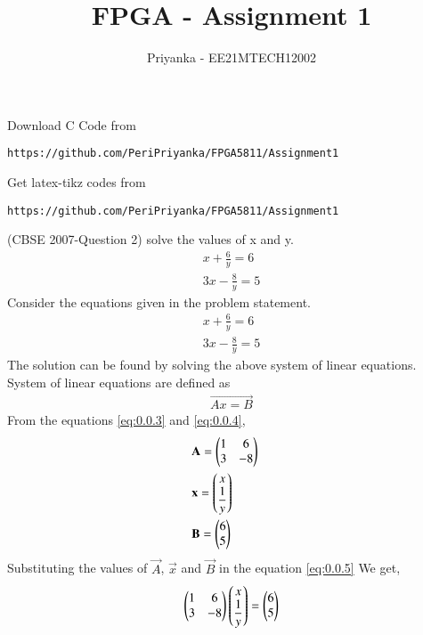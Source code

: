 \documentclass[journal,12pt,twocolumn]{IEEEtran}
\begin{document}
     \def\rightbox#1{\makebox[0in][r]{#1}}
     \def\centbox#1{\makebox[0in]{#1}}
     \def\topbox#1{\raisebox{-\baselineskip}[0in][0in]{#1}}
     \def\midbox#1{\raisebox{-0.5\baselineskip}[0in][0in]{#1}}
\vspace{3cm}
\title{FPGA - Assignment 1}
\author{Priyanka - EE21MTECH12002}
\maketitle
\newpage
\bigskip
\renewcommand{\thefigure}{\theenumi}
\renewcommand{\thetable}{\theenumi}
Download C Code from 
\begin{lstlisting}
https://github.com/PeriPriyanka/FPGA5811/Assignment1
\end{lstlisting}
%
Get latex-tikz codes from 
%
\begin{lstlisting}
https://github.com/PeriPriyanka/FPGA5811/Assignment1
\end{lstlisting}
\item (CBSE 2007-Question 2)
solve the values of x and y.
\begin{align}
&x+\displaystyle\frac{6}{y}=6 & \\ 
&3x-\displaystyle\frac{8}{y}=5&
\end{align}
\solution Consider the equations  given in the problem statement.
\begin{align}
&x+\displaystyle\frac{6}{y}=6 \label{eq:0.0.3} &\\
&3x-\displaystyle\frac{8}{y}=5 \label{eq:0.0.4} &
\end{align}
The solution can be found by solving the above system of linear equations.\\ 
System of linear equations are defined as 
\begin{align}
\vec{Ax=B}\label{eq:0.0.5}
\end{align}
From the equations \eqref{eq:0.0.3} and \eqref{eq:0.0.4}, 
\begin{align}
&\vec{A}= \myvec{1 &6\\3  & -8}&\\
\medskip
&\vec{x}= \myvec{ x\\ \displaystyle\frac{1}{y}}&\\
\medskip
&\vec{B}= \myvec{6\\5} & 
\end{align} 
Substituting the values of $\vec{A}$, $\vec{x}$ and $\vec{B}$ in the equation \eqref{eq:0.0.5}
We get,
\begin{align}
\begin{pmatrix}1&6\\3&-8\end{pmatrix} \begin{pmatrix}x\\\displaystyle\frac{1}{y}\end{pmatrix}= \begin{pmatrix}6\\5\end{pmatrix}
\end{align}
\end{document}
